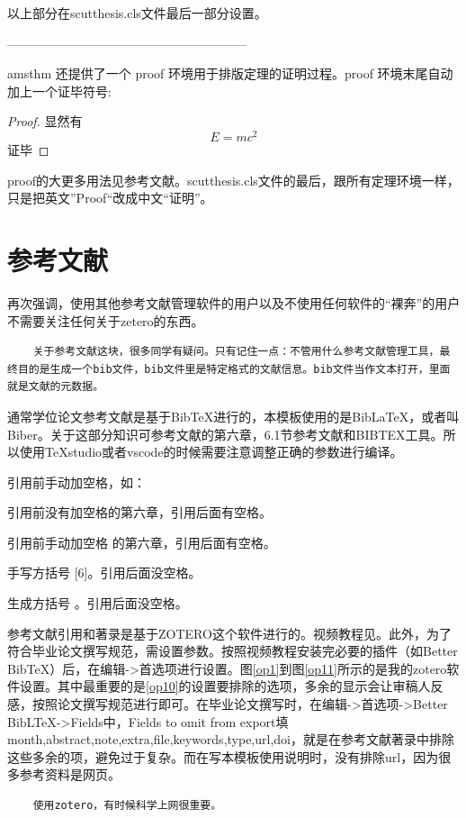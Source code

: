 以上部分在scutthesis.cls文件最后一部分设置。

---------------------------------------------------------

amsthm 还提供了一个 proof 环境用于排版定理的证明过程。proof 环境末尾自动加上一个证毕符号:
\begin{proof}
	显然有
	\[
		E=mc^2
	\]
	证毕
\end{proof}

proof的大更多用法见参考文献\cite{_g}。scutthesis.cls文件的最后，跟所有定理环境一样，只是把英文”Proof“改成中文“证明”。

\section{参考文献}

再次强调，使用其他参考文献管理软件的用户以及不使用任何软件的“裸奔”的用户不需要关注任何关于zetero的东西。
\begin{lstlisting}
	关于参考文献这块，很多同学有疑问。只有记住一点：不管用什么参考文献管理工具，最终目的是生成一个bib文件，bib文件里是特定格式的文献信息。bib文件当作文本打开，里面就是文献的元数据。
\end{lstlisting}

通常学位论文参考文献是基于BibTeX进行的，本模板使用的是BibLaTeX，或者叫Biber。关于这部分知识可参考文献\parencite{_c,_g}的第六章，6.1节参考文献和BIBTEX工具。所以使用TeXstudio或者vscode的时候需要注意调整正确的参数进行编译。

引用前手动加空格，如：

引用前没有加空格\parencite{_c,_g}的第六章，引用后面有空格。

引用前手动加空格 \parencite{_c,_g}的第六章，引用后面有空格。

手写方括号 [6]。引用后面没空格。

生成方括号 \parencite{_k}。引用后面没空格。


参考文献引用和著录是基于ZOTERO这个软件进行的。视频教程见\parencite{_k}。此外，为了符合毕业论文撰写规范，需设置参数。按照视频教程安装完必要的插件（如Better BibTeX）后，在编辑->首选项进行设置。图\ref{op1}到图\ref{op11}所示的是我的zotero软件设置。其中最重要的是\ref{op10}的设置要排除的选项，多余的显示会让审稿人反感，按照论文撰写规范进行即可。在毕业论文撰写时，在编辑->首选项->Better BibLTeX->Fields中，Fields to omit from export填month,abstract,note,extra,file,keywords,type,url,doi，就是在参考文献著录中排除这些多余的项，避免过于复杂。而在写本模板使用说明时，没有排除url，因为很多参考资料是网页。

\begin{lstlisting}
    使用zotero，有时候科学上网很重要。
\end{lstlisting}

